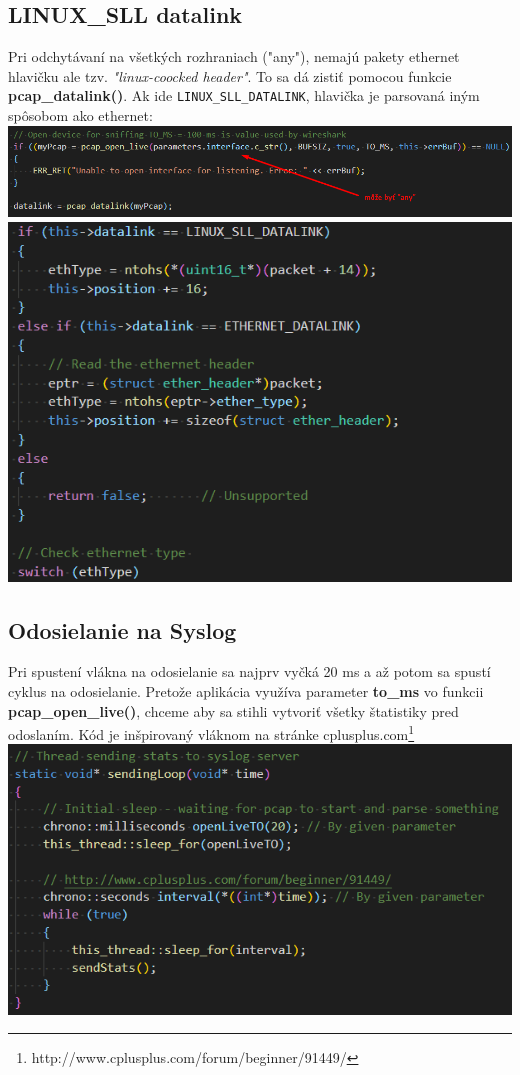 \documentclass{article}
\begin{document}
        \subsection{LINUX_SLL datalink}
        Pri odchytávaní na všetkých rozhraniach ("any"), nemajú pakety ethernet hlavičku ale tzv. \emph{"linux-coocked header"}.
        To sa dá zistiť pomocou funkcie \textbf{pcap_datalink()}. Ak ide \texttt{LINUX_SLL_DATALINK}, hlavička je parsovaná iným spôsobom ako ethernet:
        \includegraphics {datalink.png}
        \includegraphics {ethernet.png}

        \subsection{Odosielanie na Syslog}
        Pri spustení vlákna na odosielanie sa najprv vyčká 20 ms a až potom sa spustí cyklus na odosielanie. Pretože aplikácia využíva parameter \textbf{to_ms}
        vo funkcii \textbf{pcap_open_live()}, chceme aby sa stihli vytvoriť všetky štatistiky pred odoslaním. Kód je inšpirovaný vláknom na stránke
        cplusplus.com\footnote{http://www.cplusplus.com/forum/beginner/91449/}
        \includegraphics {loop.png}
\end{document}
